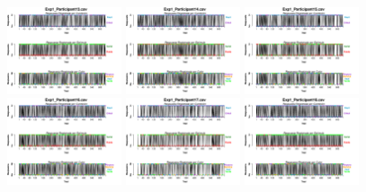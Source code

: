 \begin{itemize}
\begin{figure}[th]
\includegraphics[width=0.30\textwidth]{Figures/BiasResp_Exp1_P13} \includegraphics[width=0.30\textwidth]{Figures/BiasResp_Exp1_P14} \includegraphics[width=0.30\textwidth]{Figures/BiasResp_Exp1_P15}
\includegraphics[width=0.30\textwidth]{Figures/BiasResp_Exp1_P16} \includegraphics[width=0.30\textwidth]{Figures/BiasResp_Exp1_P17} \includegraphics[width=0.30\textwidth]{Figures/BiasResp_Exp1_P18}

\end{figure}
\end{itemize}
